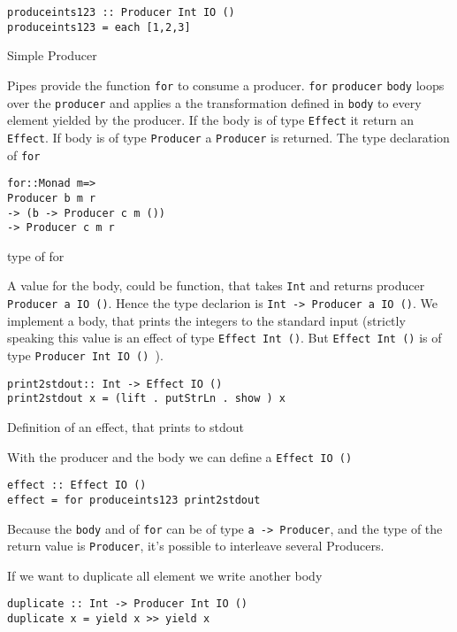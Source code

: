 \documentclass[twoside, a4paper]{article}
\begin{document}
\begin{program}
\begin{verbatim}
produceints123 :: Producer Int IO ()
produceints123 = each [1,2,3]
\end{verbatim}
\caption{Simple Producer}
\label{lst:simpleproducer}
\end{program}

Pipes provide the function \verb|for| to consume a producer. 
\verb|for| \verb|producer| \verb|body| loops over the \verb|producer| and applies a the transformation defined in \verb|body| to every element yielded by the producer. If the body is of type \verb|Effect| it return an \verb|Effect|. If body is of type \verb|Producer| a \verb|Producer| is returned. The type declaration of \verb|for| 
\begin{program}
\begin{verbatim}
for::Monad m=>
Producer b m r
-> (b -> Producer c m ())
-> Producer c m r
\end{verbatim}
\caption{type of for}
\end{program}

A value for the body, could be function, that takes \verb|Int| and returns producer \verb|Producer a IO ()|. Hence the type declarion is \verb|Int -> Producer a IO ()|. We implement a body, that prints the integers to the standard input (strictly speaking this value is an effect of type \verb|Effect Int ()|. But \verb|Effect Int ()| is of type \verb|Producer Int IO () |).

\begin{program}
\begin{verbatim}
print2stdout:: Int -> Effect IO ()
print2stdout x = (lift . putStrLn . show ) x
\end{verbatim}
\caption{Definition of an effect, that prints to stdout}
\label{lst:stdouteffect}
\end{program}

With the producer and the body we can define a \verb|Effect IO ()|
\begin{verbatim}
effect :: Effect IO ()
effect = for produceints123 print2stdout
\end{verbatim}

Because the \verb|body| and of \verb|for| can be of type \verb|a -> Producer|, and the type of the return value is \verb|Producer|, it's possible to interleave several Producers.

If we want to duplicate all element we write another body
\begin{verbatim}
duplicate :: Int -> Producer Int IO ()
duplicate x = yield x >> yield x 
\end{verbatim}
\end{document}

